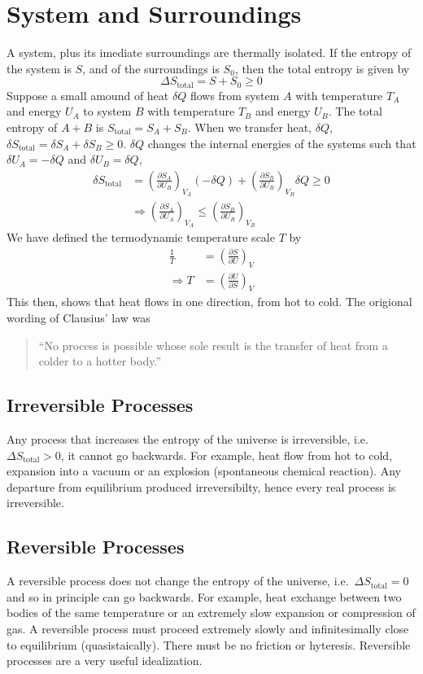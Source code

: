 \documentclass[british]{article}
\newcommand{\pd}[2]{\frac{\partial #1}{\partial #2}} %
\begin{document}
\section{System and Surroundings}
A system, plus its imediate surroundings are thermally isolated. If the entropy of the system is $S$, and of the surroundings is $S_0$, then the total entropy is given by
\[
	\Delta S_{\text{total}} = S + S_0 \ge 0
\]
Suppose a small amound of heat $\delta Q$ flows from system $A$ with temperature $T_A$ and energy $U_A$ to system $B$ with temperature $T_B$ and energy $U_B$. The total entropy of $A+B$ is $S_{\text{total}} = S_A +S_B$. When we transfer heat, $\delta Q$, $\delta S_{\text{total}} = \delta S_A + \delta S_B \ge 0$. $\delta Q$ changes the internal energies of the systems such that $\delta U_A = -\delta Q$ and $\delta U_B = \delta Q$,
\begin{align*}
	\delta S_{\text{total}} &= \left(\pd{S_A}{U_B} \right)_{V_A}(-\delta Q) + \left(\pd{S_B}{U_B}\right)_{V_B} \delta Q \ge 0 \\
	&\Rightarrow \left(\pd{S_A}{U_A}\right)_{V_A} \le \left(\pd{S_B}{U_B}\right)_{V_B} 
\end{align*}
We have defined the termodynamic temperature scale $T$ by 
\begin{align*}
	\frac{1}{T} &= \left(\pd{S}{U}\right)_V \\
	\Rightarrow T &= \left(\pd{U}{S} \right)_V
\end{align*}
This then, shows that heat flows in one direction, from hot to cold. The origional wording of Clausius' law was 
\begin{quote}
	``No process is possible whose sole result is the transfer of heat from a colder to a hotter body.''
\end{quote}

\subsection{Irreversible Processes}
Any process that increases the entropy of the universe is irreversible, i.e.\ $\Delta S_\text{total} > 0$, it cannot go backwards. For example, heat flow from hot to cold, expansion into a vacuum or an explosion (spontaneous chemical reaction). Any departure from equilibrium produced irreversibilty, hence every real process is irreversible.

\subsection{Reversible Processes}
A reversible process  does not change the entropy of the universe, i.e.\ $\Delta S_\text{total} = 0$ and so in principle can go backwards. For example, heat exchange between two bodies of the same temperature or an extremely slow expansion or compression of gas. A reversible process must proceed extremely slowly and infinitesimally close to equilibrium (quasistaically). There must be no friction or hyteresis. Reversible processes are a very useful idealization.
\end{document}
